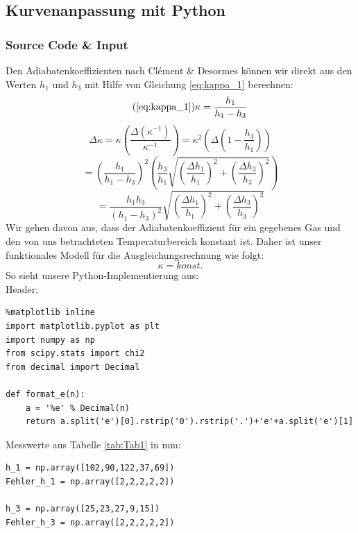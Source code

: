 \documentclass[a4paper,10pt]{article}
\begin{document}
\subsection{Kurvenanpassung mit Python}
\subsubsection{Source Code \& Input}
Den Adiabatenkoeffizienten nach Clément \& Desormes können wir direkt aus den Werten \(h_1 \)  und \(h_3 \) mit Hilfe von Gleichung \eqref{eq:kappa_1} berechnen:
\begin{equation}\tag{\ref{eq:kappa_1}}
\kappa = \frac{h_1}{h_1-h_3} 
\end{equation}
\begin{equation*}
\Delta \kappa = \kappa \left(\frac{\Delta \left(\kappa^{-1}\right)}{\kappa^{-1}}\right) = {\kappa^2 }\left( \Delta \left(1-\frac{h_3}{h_1}\right)\right)
\end{equation*}
\begin{equation*}
= \left({\frac{h_1}{h_1-h_3}} \right)^2 \left( \frac{h_3}{h_1} \sqrt{{\left(\frac{\Delta  h_1}{h_1}\right)^2}+{\left(\frac{\Delta  h_3}{h_3}\right)^2}}\right) 
\end{equation*}
\begin{equation} \label{eq:Deltakappa_1}
= {\frac{h_1 h_3}{\left( h_1-h_3 \right)^2}} \sqrt{{\left(\frac{ \Delta  h_1}{h_1}\right)^2}+{\left(\frac{ \Delta h_3}{h_3}\right)^2}}
\end{equation}
Wir gehen davon aus, dass der Adiabatenkoeffizient für ein gegebenes Gas und den von uns betrachteten Temperaturbereich konstant ist.
Daher ist unser funktionales Modell für die Ausgleichungsrechnung wie folgt:
\begin{equation} \label{eq:Fit1}
	\kappa = konst.
\end{equation} 
So sieht unsere Python-Implementierung aus:\\

Header:
\begin{lstlisting}
%matplotlib inline
import matplotlib.pyplot as plt
import numpy as np
from scipy.stats import chi2
from decimal import Decimal

def format_e(n):
    a = '%e' % Decimal(n)
    return a.split('e')[0].rstrip('0').rstrip('.')+'e'+a.split('e')[1]

\end{lstlisting}

Messwerte aus Tabelle \ref{tab:Tab1} in mm:\begin{lstlisting}
h_1 = np.array([102,90,122,37,69])
Fehler_h_1 = np.array([2,2,2,2,2])

h_3 = np.array([25,23,27,9,15])
Fehler_h_3 = np.array([2,2,2,2,2])

\end{lstlisting}
\end{document}

